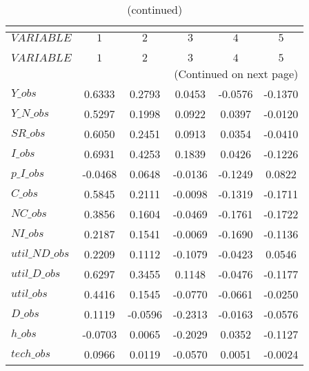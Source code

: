  
\begin{center}
\begin{longtable}{lccccc} 
\caption{AUTOCORRELATION OF SIMULATED VARIABLES}\\
 \label{Table:sim_autocorr_matrix}\\
\toprule 
$VARIABLE       $	 & 	 $          1$	 & 	 $          2$	 & 	 $          3$	 & 	 $          4$	 & 	 $          5$\\
\midrule \endfirsthead 
\caption{(continued)}\\
 \toprule \\ 
$VARIABLE       $	 & 	 $          1$	 & 	 $          2$	 & 	 $          3$	 & 	 $          4$	 & 	 $          5$\\
\midrule \endhead 
\midrule \multicolumn{6}{r}{(Continued on next page)} \\ \bottomrule \endfoot 
\bottomrule \endlastfoot 
$Y\_obs         $	 & 	     0.6333	 & 	     0.2793	 & 	     0.0453	 & 	    -0.0576	 & 	    -0.1370 \\ 
$Y\_N\_obs      $	 & 	     0.5297	 & 	     0.1998	 & 	     0.0922	 & 	     0.0397	 & 	    -0.0120 \\ 
$SR\_obs        $	 & 	     0.6050	 & 	     0.2451	 & 	     0.0913	 & 	     0.0354	 & 	    -0.0410 \\ 
$I\_obs         $	 & 	     0.6931	 & 	     0.4253	 & 	     0.1839	 & 	     0.0426	 & 	    -0.1226 \\ 
$p\_I\_obs      $	 & 	    -0.0468	 & 	     0.0648	 & 	    -0.0136	 & 	    -0.1249	 & 	     0.0822 \\ 
$C\_obs         $	 & 	     0.5845	 & 	     0.2111	 & 	    -0.0098	 & 	    -0.1319	 & 	    -0.1711 \\ 
$NC\_obs        $	 & 	     0.3856	 & 	     0.1604	 & 	    -0.0469	 & 	    -0.1761	 & 	    -0.1722 \\ 
$NI\_obs        $	 & 	     0.2187	 & 	     0.1541	 & 	    -0.0069	 & 	    -0.1690	 & 	    -0.1136 \\ 
$util\_ND\_obs  $	 & 	     0.2209	 & 	     0.1112	 & 	    -0.1079	 & 	    -0.0423	 & 	     0.0546 \\ 
$util\_D\_obs   $	 & 	     0.6297	 & 	     0.3455	 & 	     0.1148	 & 	    -0.0476	 & 	    -0.1177 \\ 
$util\_obs      $	 & 	     0.4416	 & 	     0.1545	 & 	    -0.0770	 & 	    -0.0661	 & 	    -0.0250 \\ 
$D\_obs         $	 & 	     0.1119	 & 	    -0.0596	 & 	    -0.2313	 & 	    -0.0163	 & 	    -0.0576 \\ 
$h\_obs         $	 & 	    -0.0703	 & 	     0.0065	 & 	    -0.2029	 & 	     0.0352	 & 	    -0.1127 \\ 
$tech\_obs      $	 & 	     0.0966	 & 	     0.0119	 & 	    -0.0570	 & 	     0.0051	 & 	    -0.0024 \\ 
\end{longtable}
 \end{center}

